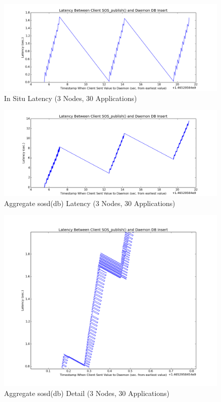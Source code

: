 \begin{figure}[!t]
\centering
\includegraphics[width=\columnwidth]{images/aciss_latency_3_situ.png}
\caption{In Situ Latency (3 Nodes, 30 Applications)}
\label{aciss_lat_3_situ}
\end{figure}

\begin{figure}[!t]
\centering
\includegraphics[width=\columnwidth]{images/aciss_latency_3_agg.png}
\caption{Aggregate sosd(db) Latency (3 Nodes, 30 Applications)}
\label{aciss_lat_3_agg}
\end{figure}

\begin{figure}[!t]
\centering
\includegraphics[width=\columnwidth]{images/aciss_latency_3_agg_zm.png}
\caption{Aggregate sosd(db) Detail (3 Nodes, 30 Applications)}
\label{aciss_lat_3_agg_detail}
\end{figure}

